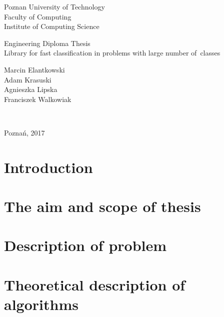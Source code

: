 \documentclass[12pt]{article}
\begin{document}
\thispagestyle{empty}
\begin{center}
	\begin{Large}
	Poznan University of Technology\\
	Faculty of Computing\\
	Institute of Computing Science\\
	\end{Large}
	\vspace*{\fill}
		\begin{Large}
			Engineering Diploma Thesis\\
			\vspace{2ex}
			Library for fast classification in problems with large number of~classes\\
			\vspace{2ex}
		\end{Large}
		\begin{large}
			\vspace{2ex}
			Marcin Elantkowski\\
			Adam Krasuski\\
			Agnieszka Lipska\\
			Franciszek Walkowiak\\
		\end{large}
	\vspace*{\fill}
\end{center}
\begin{large}
	\\
\end{large}
\begin{center}
	\vspace{5ex}
	Poznań, 2017
\end{center}
\restoregeometry
\newpage
\tableofcontents
\newpage
\section{Introduction}
	
\section{The aim and scope of thesis}
	
\section{Description of problem}
	
\section{Theoretical description of algorithms}
\end{document}
